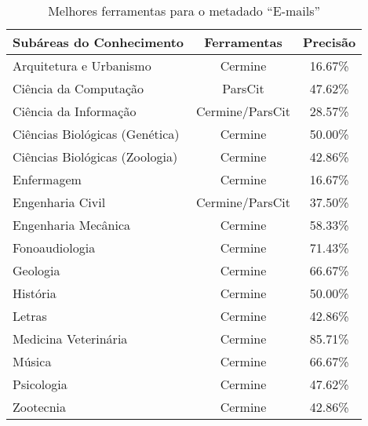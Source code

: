 \begin{table}[h!]
    \caption{Melhores ferramentas para o metadado ``E-mails''}
    \begin{center}
        \begin{tabular}{|l|c|c|}
            \hline 
            \textbf{Subáreas do Conhecimento} & \textbf{Ferramentas} & \textbf{Precisão} \\ 
            \hline 
            Arquitetura e Urbanismo & Cermine & 16.67\% \\ \hline
            Ciência da Computação & ParsCit & 47.62\% \\ \hline
            Ciência da Informação & Cermine/ParsCit & 28.57\% \\ \hline
            Ciências Biológicas (Genética) & Cermine & 50.00\% \\ \hline
            Ciências Biológicas (Zoologia) & Cermine & 42.86\% \\ \hline
            Enfermagem & Cermine & 16.67\% \\ \hline
            Engenharia Civil & Cermine/ParsCit & 37.50\% \\ \hline
            Engenharia Mecânica & Cermine & 58.33\% \\ \hline
            Fonoaudiologia & Cermine & 71.43\% \\ \hline
            Geologia & Cermine & 66.67\% \\ \hline
            História & Cermine & 50.00\% \\ \hline
            Letras & Cermine & 42.86\% \\ \hline
            Medicina Veterinária & Cermine & 85.71\% \\ \hline
            Música & Cermine & 66.67\% \\ \hline
            Psicologia & Cermine & 47.62\% \\ \hline
            Zootecnia & Cermine & 42.86\% \\ \hline
        \end{tabular}
    \end{center}
    \label{tab:areas-emails-tools}
\end{table}

